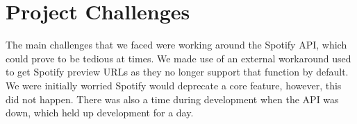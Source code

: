\documentclass{article}
\begin{document}

\section{Project Challenges}
\quad The main challenges that we faced were working around the Spotify API, which could prove to be tedious at times.  We made use of an external workaround used to get Spotify preview URLs as they no longer support that function by default.  We were initially worried Spotify would deprecate a core feature, however, this did not happen. There was also a time during development when the API was down, which held up development for a day.


\end{document}
